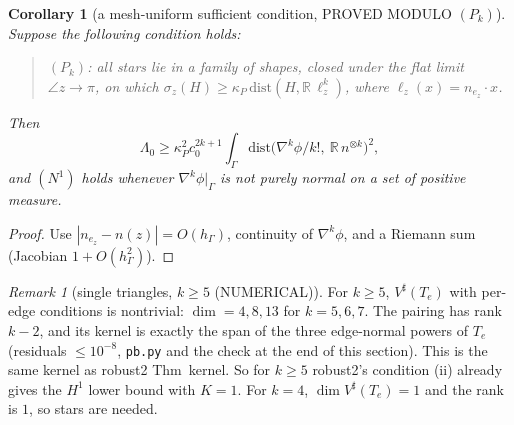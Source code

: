 \documentclass[11pt]{article}
\newtheorem{corollary}[theorem]{Corollary}
\theoremstyle{remark}
\newtheorem{remark}[theorem]{Remark}
\newcommand{\hG}{h_\Gamma}
\begin{document}
\begin{corollary}[a mesh-uniform sufficient condition, PROVED MODULO $(P_k)$]
Suppose the following condition holds:
\begin{quote}
$(P_k)$: all stars lie in a family of shapes, closed under the flat limit $\angle z\to\pi$, on which
$\sigma_z(H)\ge\kappa_P\,\mathrm{dist}(H,\mathbb R\,\ell_z^k)$, where $\ell_z(x)=n_{e_z}\cdot x$.
\end{quote}
Then
\[
\Lambda_0\ge\kappa_P^2c_0^{2k+1}\int_\Gamma\mathrm{dist}\big(\nabla^k\phi/k!,\ \mathbb R\,n^{\otimes k}\big)^2 ,
\]
and $(N^1)$ holds whenever $\nabla^k\phi|_\Gamma$ is not purely normal on a set of positive measure.
\end{corollary}
\begin{proof}
Use $|n_{e_z}-n(z)|=O(\hG)$, continuity of $\nabla^k\phi$, and a Riemann sum (Jacobian $1+O(\hG^2)$).
\end{proof}

\begin{remark}[single triangles, $k\ge5$ (NUMERICAL)]
For $k\ge5$, $V^\sharp(T_e)$ with per-edge conditions is nontrivial: $\dim=4,8,13$ for $k=5,6,7$. The pairing has rank $k-2$, and
its kernel is exactly the span of the three edge-normal powers of $T_e$ (residuals $\le10^{-8}$, \texttt{pb.py} and the
check at the end of this section). This is the same kernel as robust2 Thm~kernel. So for $k\ge5$ robust2's condition (ii)
already gives the $H^1$ lower bound with $K=1$. For $k=4$, $\dim V^\sharp(T_e)=1$ and the rank is $1$, so stars are needed.
\end{remark}
\end{document}
